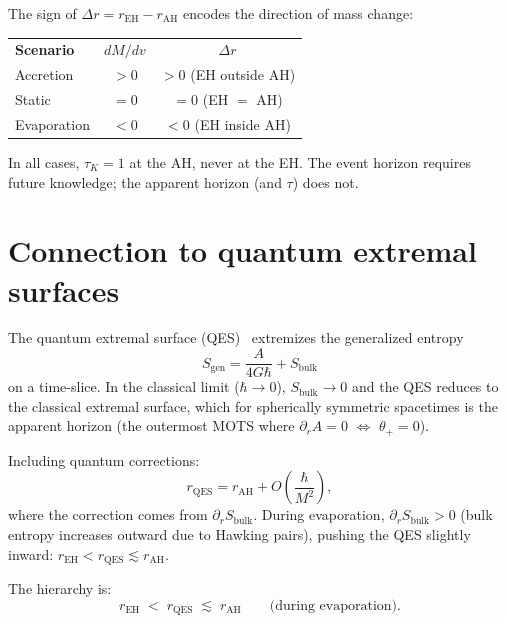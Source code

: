 \documentclass[prl,twocolumn,superscriptaddress,longbibliography,floatfix]{revtex4-2}
\newcommand{\tauasym}{\tau}
\begin{document}
The sign of $\Delta r = r_{\text{EH}} - r_{\text{AH}}$
encodes the direction of mass change:
\begin{center}
\begin{tabular}{lcc}
  \textbf{Scenario} & $dM/dv$ & $\Delta r$ \\
  \colrule
  Accretion & $> 0$ & $> 0$ (EH outside AH) \\
  Static    & $= 0$ & $= 0$ (EH $=$ AH) \\
  Evaporation & $< 0$ & $< 0$ (EH inside AH) \\
\end{tabular}
\end{center}

In all cases, $\tauasym_K = 1$ at the AH, never at the EH.
The event horizon requires future knowledge;
the apparent horizon (and $\tauasym$) does not.

\section{Connection to quantum extremal surfaces}
\label{sec:QES}

The quantum extremal surface
(QES)~\cite{Engelhardt2015,Penington2020}
extremizes the generalized entropy
\begin{equation}
  S_{\text{gen}} = \frac{A}{4G\hbar} + S_{\text{bulk}}
\end{equation}
on a time-slice.  In the classical limit
($\hbar \to 0$), $S_{\text{bulk}} \to 0$ and the QES
reduces to the classical extremal surface, which for
spherically symmetric spacetimes is the apparent horizon
(the outermost MOTS where $\partial_r A = 0$
$\Leftrightarrow$ $\theta_+ = 0$).

Including quantum corrections:
\begin{equation}
  r_{\text{QES}} = r_{\text{AH}}
  + O\!\left(\frac{\hbar}{M^2}\right),
\end{equation}
where the correction comes from $\partial_r S_{\text{bulk}}$.
During evaporation, $\partial_r S_{\text{bulk}} > 0$
(bulk entropy increases outward due to Hawking pairs),
pushing the QES slightly inward:
$r_{\text{EH}} < r_{\text{QES}} \lesssim r_{\text{AH}}$.

The hierarchy is:
\begin{equation}
  r_{\text{EH}} \;<\; r_{\text{QES}}
  \;\lesssim\; r_{\text{AH}}
  \qquad\text{(during evaporation)}.
\end{equation}
\end{document}

